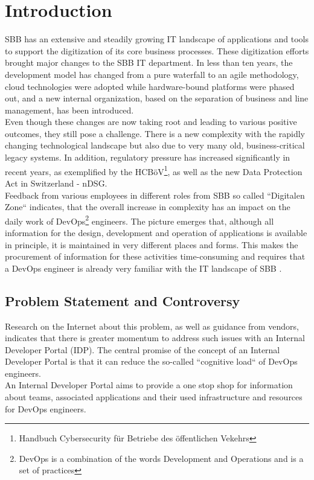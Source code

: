 \documentclass[a4paper,12pt]{article}
\begin{document}
    \section{Introduction}
    \label{sec:introduction}
    SBB has an extensive and steadily growing IT landscape of applications and tools to support the digitization of its
    core business processes.
    These digitization efforts brought major changes to the SBB IT department.
    In less than ten years, the development model has changed from a pure waterfall to an agile methodology,
    cloud technologies were adopted while hardware-bound platforms were phased out, and a new internal organization,
    based on the separation of business and line management, has been introduced.\\
    Even though these changes are now taking root and leading to various positive outcomes, they still pose a challenge.
    There is a new complexity with the rapidly changing technological landscape but also due to very many old,
    business-critical legacy systems.
    In addition, regulatory pressure has increased significantly in recent years, as exemplified by the
    HCBöV\footnote{Handbuch Cybersecurity für Betriebe des öffentlichen Vekehrs}, as well as the new Data Protection Act in Switzerland - nDSG.\\
    Feedback from various employees in different roles from SBB so called ``Digitalen Zone`` indicates, that the overall
    increase in complexity has an impact on the daily work of DevOps\footnote{DevOps is a combination of the words
    Development and Operations and is a set of practices} engineers.
    The picture emerges that, although all information for the design, development and operation of
    applications is available in principle, it is maintained in very different places and forms.
    This makes the procurement of information for these activities time-consuming and requires that a DevOps
    engineer is already very familiar with the IT landscape of SBB .

    \subsection{Problem Statement and Controversy}
    \label{subsec:iproblemstatement}
    Research on the Internet about this problem, as well as guidance from vendors, indicates that there is greater momentum
    to address such issues with an Internal Developer Portal (IDP).
    The central promise of the concept of an Internal Developer Portal is that it can reduce the so-called
    ``cognitive load`` of DevOps engineers.\\
    An Internal Developer Portal aims to provide a one stop shop for information about teams, associated applications and
    their used infrastructure and resources for DevOps engineers.
\end{document}
